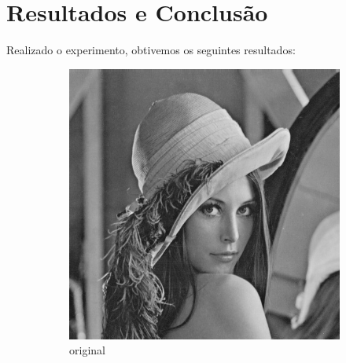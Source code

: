 \documentclass[a4paper,12pt]{article}
\begin{document}
\section{Resultados e Conclusão}
\label{sec:resultados}



Realizado o experimento, obtivemos os seguintes resultados:

\begin{figure}[!htb]
\centering
\begin{subfigure}[b]{0.2\linewidth}
    \includegraphics[width=\linewidth]{img/lena_gray.jpg}
    \caption{original}
\end{subfigure} \hspace{0.5cm}
\begin{subfigure}[b]{0.2\linewidth}

\end{subfigure}
\end{figure}
\end{document}
